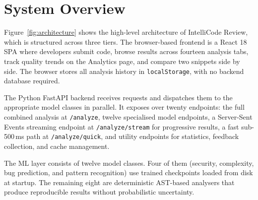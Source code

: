 \documentclass[12pt, oneside]{report}
\begin{document}
\section{System Overview}
\label{sec:overview}

Figure~\ref{fig:architecture} shows the high-level architecture of IntelliCode Review,
which is structured across three tiers. The browser-based frontend is a React 18 SPA
where developers submit code, browse results across fourteen analysis tabs, track quality
trends on the Analytics page, and compare two snippets side by side. The browser stores all analysis history in \texttt{localStorage}, with no backend database required.

The Python FastAPI backend receives requests and dispatches them to the appropriate
model classes in parallel. It exposes over twenty endpoints: the full combined analysis
at \texttt{/analyze}, twelve specialised model endpoints, a Server-Sent Events streaming
endpoint at \texttt{/analyze/stream} for progressive results, a fast sub-500\,ms path
at \texttt{/analyze/quick}, and utility endpoints for statistics, feedback collection,
and cache management.

The ML layer consists of twelve model classes. Four of them (security, complexity, bug prediction, and pattern recognition) use trained checkpoints loaded from disk at startup. The remaining eight are deterministic AST-based analysers that produce
reproducible results without probabilistic uncertainty.
\end{document}
